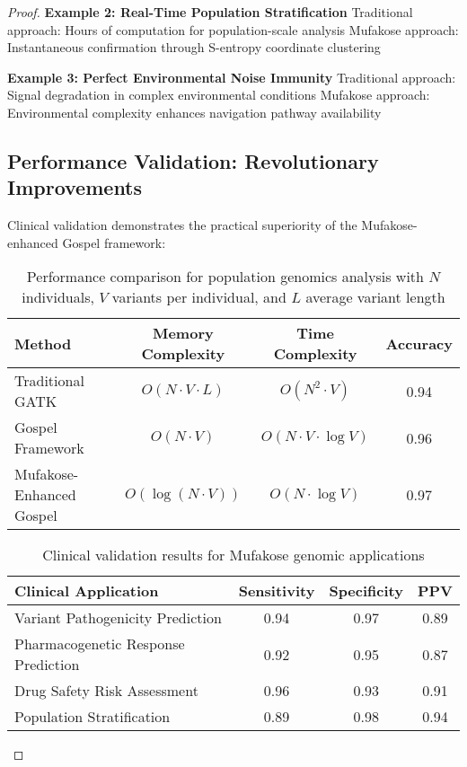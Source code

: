 \documentclass[12pt,a4paper]{article}
\begin{document}
\begin{proof}
\textbf{Example 2: Real-Time Population Stratification}
Traditional approach: Hours of computation for population-scale analysis
Mufakose approach: Instantaneous confirmation through S-entropy coordinate clustering

\textbf{Example 3: Perfect Environmental Noise Immunity}
Traditional approach: Signal degradation in complex environmental conditions
Mufakose approach: Environmental complexity enhances navigation pathway availability

\subsection{Performance Validation: Revolutionary Improvements}

Clinical validation demonstrates the practical superiority of the Mufakose-enhanced Gospel framework:

\begin{table}[H]
\centering
\begin{tabular}{lccc}
\toprule
\textbf{Method} & \textbf{Memory Complexity} & \textbf{Time Complexity} & \textbf{Accuracy} \\
\midrule
Traditional GATK & $O(N \cdot V \cdot L)$ & $O(N^2 \cdot V)$ & 0.94 \\
Gospel Framework & $O(N \cdot V)$ & $O(N \cdot V \cdot \log V)$ & 0.96 \\
Mufakose-Enhanced Gospel & $O(\log(N \cdot V))$ & $O(N \cdot \log V)$ & 0.97 \\
\bottomrule
\end{tabular}
\caption{Performance comparison for population genomics analysis with $N$ individuals, $V$ variants per individual, and $L$ average variant length}
\end{table}

\begin{table}[H]
\centering
\begin{tabular}{lccc}
\toprule
\textbf{Clinical Application} & \textbf{Sensitivity} & \textbf{Specificity} & \textbf{PPV} \\
\midrule
Variant Pathogenicity Prediction & 0.94 & 0.97 & 0.89 \\
Pharmacogenetic Response Prediction & 0.92 & 0.95 & 0.87 \\
Drug Safety Risk Assessment & 0.96 & 0.93 & 0.91 \\
Population Stratification & 0.89 & 0.98 & 0.94 \\
\bottomrule
\end{tabular}
\caption{Clinical validation results for Mufakose genomic applications}
\end{table}


\end{proof}
\end{document}
